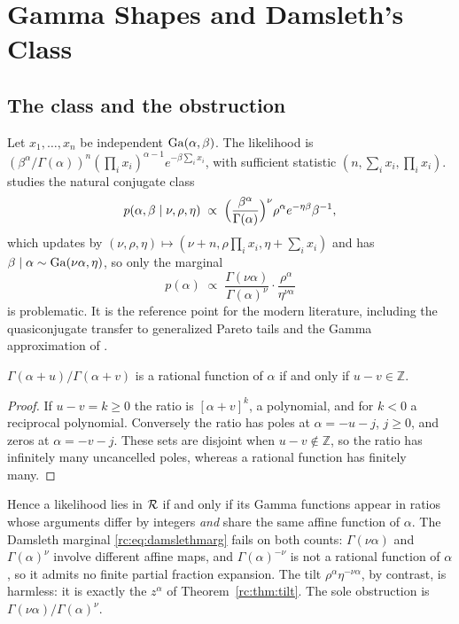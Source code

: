 \section{Gamma Shapes and Damsleth's Class}\label{rc:sec:gamma}

\subsection{The class and the obstruction}

Let $x_1,\dots,x_n$ be independent $\mathrm{Ga}(\alpha,\beta)$. The likelihood is $(\beta^\alpha/\Gamma(\alpha))^n(\prod_ix_i)^{\alpha-1}e^{-\beta\sum_ix_i}$, with sufficient statistic $(n,\sum_ix_i,\prod_ix_i)$. \citet{rc:damsleth1975} studies the natural conjugate class
\begin{equation}\label{rc:eq:damsleth}
p(\alpha,\beta\mid\nu,\rho,\eta)\;\propto\;\Bigl(\frac{\beta^\alpha}{\Gamma(\alpha)}\Bigr)^\nu\rho^\alpha e^{-\eta\beta}\beta^{-1},
\end{equation}
which updates by $(\nu,\rho,\eta)\mapsto(\nu+n,\rho\prod_ix_i,\eta+\sum_ix_i)$ and has $\beta\mid\alpha\sim\mathrm{Ga}(\nu\alpha,\eta)$, so only the marginal
\begin{equation}\label{rc:eq:damslethmarg}
p(\alpha)\;\propto\;\frac{\Gamma(\nu\alpha)}{\Gamma(\alpha)^\nu}\cdot\frac{\rho^\alpha}{\eta^{\nu\alpha}}
\end{equation}
is problematic. It is the reference point for the modern literature, including the quasiconjugate transfer to generalized Pareto tails and the Gamma approximation of \citet{rc:miller2019}.

\begin{proposition}\label{rc:prop:boundary}
$\Gamma(\alpha+u)/\Gamma(\alpha+v)$ is a rational function of $\alpha$ if and only if $u-v\in\mathbb{Z}$.
\end{proposition}

\begin{proof}
If $u-v=k\ge0$ the ratio is $[\alpha+v]^k$, a polynomial, and for $k<0$ a reciprocal polynomial. Conversely the ratio has poles at $\alpha=-u-j$, $j\ge0$, and zeros at $\alpha=-v-j$. These sets are disjoint when $u-v\notin\mathbb{Z}$, so the ratio has infinitely many uncancelled poles, whereas a rational function has finitely many.
\end{proof}

Hence a likelihood lies in $\mathcal{R}$ if and only if its Gamma functions appear in ratios whose arguments differ by integers \emph{and} share the same affine function of $\alpha$. The Damsleth marginal \eqref{rc:eq:damslethmarg} fails on both counts: $\Gamma(\nu\alpha)$ and $\Gamma(\alpha)^\nu$ involve different affine maps, and $\Gamma(\alpha)^{-\nu}$ is not a rational function of $\alpha$, so it admits no finite partial fraction expansion. The tilt $\rho^\alpha\eta^{-\nu\alpha}$, by contrast, is harmless: it is exactly the $z^\alpha$ of Theorem~\ref{rc:thm:tilt}. The sole obstruction is $\Gamma(\nu\alpha)/\Gamma(\alpha)^\nu$.


